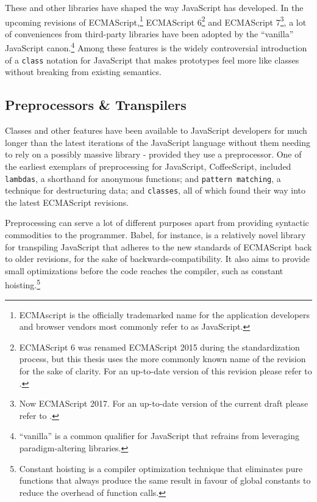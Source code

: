 \documentclass[oneside,11pt,xetex]{scrbook}
\begin{document}
These and other libraries have shaped the way JavaScript has developed. In the
upcoming revisions of ECMAScript,\footnote{ECMAscript is the officially trademarked
name for the application developers and browser vendors most commonly refer to as
JavaScript.} ECMAScript 6\footnote{ECMAScript 6 was renamed ECMAScript 2015
during the standardization process, but this thesis uses the more commonly known name
of the revision for the sake of clarity. For an up-to-date version of this revision
please refer to \parencite{ECMA6}.} and ECMAScript 7\footnote{Now ECMAScript 2017. For
an up-to-date version of the current draft please refer to \parencite{ECMA7}.}, a
lot of conveniences from third-party libraries have been adopted by the ``vanilla''
JavaScript canon.\footnote{``vanilla'' is a common qualifier for JavaScript that
refrains from leveraging paradigm-altering libraries.}
Among these features is the widely controversial introduction of a \texttt{class}
notation for JavaScript that makes prototypes feel more like classes without
breaking from existing semantics.

\subsection{Preprocessors \& Transpilers}
\label{pretrans}

Classes and other features have been available to JavaScript developers for much
longer than the latest iterations of the JavaScript language without them needing
to rely on a possibly massive library - provided they use a preprocessor.
One of the earliest exemplars of preprocessing for JavaScript, CoffeeScript, included
\texttt{lambdas}, a shorthand for anonymous functions; and \texttt{pattern matching},
a technique for destructuring data; and \texttt{classes}, all of which found
their way into the latest ECMAScript revisions.

Preprocessing can serve a lot of different purposes apart from providing
syntactic commodities to the programmer. Babel, for instance, is a relatively
novel library for transpiling JavaScript that adheres to the new standards
of ECMAScript back to older revisions, for the sake of backwards-compatibility.
It also aims to provide small optimizations before the code reaches the compiler,
such as constant hoisting.\footnote{Constant hoisting is a compiler optimization
technique that eliminates pure functions that always produce the same result in favour
of global constants to reduce the overhead of function calls.}
\end{document}
